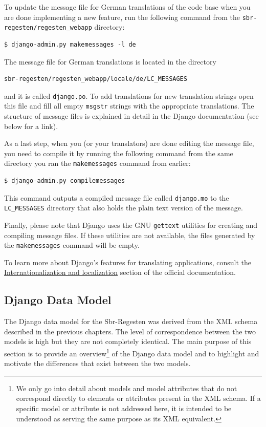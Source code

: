 To update the message file for German translations of the code base
when you are done implementing a new feature, run the following
command from the \texttt{sbr-regesten/regesten\_webapp} directory:

\begin{verbatim}
$ django-admin.py makemessages -l de
\end{verbatim}

The message file for German translations is located in the directory

\begin{verbatim}
sbr-regesten/regesten_webapp/locale/de/LC_MESSAGES
\end{verbatim}

and it is called \texttt{django.po}. To add translations for new
translation strings open this file and fill all empty \texttt{msgstr}
strings with the appropriate translations. The structure of message
files is explained in detail in the Django documentation (see below
for a link).

As a last step, when you (or your translators) are done editing the
message file, you need to compile it by running the following command
from the same directory you ran the \texttt{makemessages} command from
earlier:

\begin{verbatim}
$ django-admin.py compilemessages
\end{verbatim}

This command outputs a compiled message file called \texttt{django.mo}
to the \texttt{LC\_MESSAGES} directory that also holds the plain text
version of the message.

Finally, please note that Django uses the GNU \texttt{gettext}
utilities for creating and compiling message files. If these utilities
are not available, the files generated by the \texttt{makemessages}
command will be empty.

To learn more about Django's features for translating applications,
consult the
\href{https://docs.djangoproject.com/en/1.4/topics/i18n/}{Internationalization
  and localization} section of the official documentation.

\subsection{Django Data Model}
\label{sec:data-model}

The Django data model for the Sbr-Regesten was derived from the XML
schema described in the previous chapters. The level of correspondence
between the two models is high but they are not completely identical.
The main purpose of this section is to provide an overview\footnote{We
  only go into detail about models and model attributes that do not
  correspond directly to elements or attributes present in the XML
  schema. If a specific model or attribute is not addressed here, it
  is intended to be understood as serving the same purpose as its XML
  equivalent.} of the Django data model and to highlight and motivate
the differences that exist between the two models.


